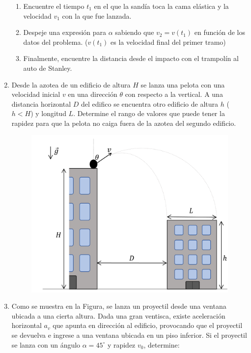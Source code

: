 \documentclass[letterpaper,11pt]{article}
\begin{document}
\begin{enumerate}
\begin{figure}[H]
    \centering
        \centering
        
\end{figure}

\begin{enumerate}
    \item Encuentre el tiempo $t_1$ en el que la sandía toca la cama elástica y la velocidad $v_1$ con la que fue lanzada. 
    \item Despeje una expresión para $\alpha$ sabiendo que $v_2 = v(t_1)$ en función de los datos del problema. ($v(t_1)$ es la velocidad final del primer tramo)
    \item Finalmente, encuentre la distancia desde el impacto con el trampolín al auto de Stanley.
\end{enumerate}

\item Desde la azotea de un edificio de altura $H$ se lanza una pelota con una velocidad inicial $v$ en una dirección $\theta$ con respecto a la vertical. A una distancia horizontal $D$ del edifico se encuentra otro edificio de altura $h$ ($h < H$) y longitud $L$. Determine el rango de valores que puede tener la rapidez para que la pelota no caiga fuera de la azotea del segundo edificio.

\begin{figure}[H]
    \centering
    \includegraphics[width=0.4\linewidth]{2023-1/img/TD 1/edificios.png}
\end{figure}

\item 
\begin{multicols}{2}
Como se muestra en la Figura, se lanza un proyectil desde una ventana ubicada a una cierta altura. Dada una gran ventisca, existe aceleración horizontal $a_v$ que apunta en dirección al edificio, provocando que el proyectil se devuelva e ingrese a una ventana ubicada en un piso inferior. Si el proyectil se lanza con un ángulo $\alpha=45^{\circ}$ y rapidez $v_0$, determine:


\end{multicols}
\end{enumerate}
\end{document}
